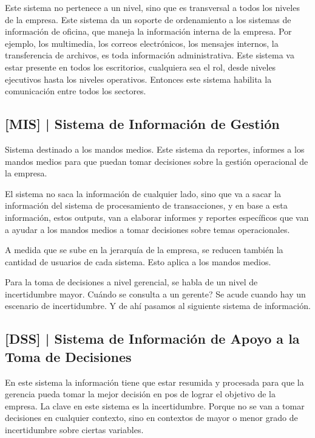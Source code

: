 Este sistema no pertenece a un nivel, sino que es transversal a todos
los niveles de la empresa. Este sistema da un soporte de ordenamiento a
los sistemas de información de oficina, que maneja la información
interna de la empresa. Por ejemplo, los multimedia, los correos
electrónicos, los mensajes internos, la transferencia de archivos, es
toda información administrativa. Este sistema va estar presente en todos
los escritorios, cualquiera sea el rol, desde niveles ejecutivos hasta
los niveles operativos. Entonces este sistema habilita la comunicación
entre todos los sectores.

\hypertarget{sistema-de-informaciuxf3n-de-gestiuxf3n-mis}{%
\subsection{%
{[}MIS{]} |
Sistema de Información de Gestión
}\label{sistema-de-informaciuxf3n-de-gestiuxf3n-mis}}

Sistema destinado a los mandos medios. Este sistema da reportes,
informes a los mandos medios para que puedan tomar decisiones sobre la
gestión operacional de la empresa.

El sistema no saca la información de cualquier lado, sino que va a sacar
la información del sistema de procesamiento de transacciones, y en base
a esta información, estos outputs, van a elaborar informes y reportes
específicos que van a ayudar a los mandos medios a tomar decisiones
sobre temas operacionales.

A medida que se sube en la jerarquía de la empresa, se reducen también
la cantidad de usuarios de cada sistema. Esto aplica a los mandos
medios.

Para la toma de decisiones a nivel gerencial, se habla de un nivel de
incertidumbre mayor. Cuándo se consulta a un gerente? Se acude cuando
hay un escenario de incertidumbre. Y de ahí pasamos al siguiente sistema
de información.

\hypertarget{sistema-de-informaciuxf3n-de-apoyo-a-la-toma-de-decisiones}{%
\subsection{%
{[}DSS{]} |
Sistema de Información de Apoyo a la Toma de Decisiones
}\label{sistema-de-informaciuxf3n-de-apoyo-a-la-toma-de-decisiones}}

En este sistema la información tiene que estar resumida y procesada para
que la gerencia pueda tomar la mejor decisión en pos de lograr el
objetivo de la empresa. La clave en este sistema es la incertidumbre.
Porque no se van a tomar decisiones en cualquier contexto, sino en
contextos de mayor o menor grado de incertidumbre sobre ciertas
variables.

